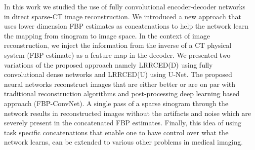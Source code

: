 In this work we studied the use of fully convolutional encoder-decoder networks in direct sparse-\ac{CT} image reconstruction. We introduced a new approach that uses lower dimension \ac{FBP} estimates as concatenations to help the network learn the mapping from sinogram to image space. In the context of image reconstruction, we inject the information from the inverse of a \ac{CT} physical system (\ac{FBP} estimate) as a feature map in the decoder. We presented two variations of the proposed approach namely \ac{LRRCED}(D) using fully convolutional dense networks and \ac{LRRCED}(U) using U-Net. The proposed neural networks reconstruct images that are either better or are on par with traditional reconstruction algorithms and post-processing deep learning based approach (FBP-ConvNet). A single pass of a sparse sinogram through the network results in reconstructed images without the artifacts and noise which are severely present in the concatenated \ac{FBP} estimates. Finally, this idea of using task specific concatenations that enable one to have control over what the network learns, can be extended to various other problems in medical imaging. 


